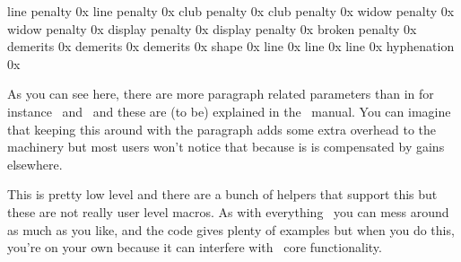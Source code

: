 \NC \type {\interlinepenalty}      \NC line penalty    \NC 0x\uchexnumbers\frozenlinepenaltycode    \NC \NR
\NC \type {\interlinepenalties}    \NC line penalty    \NC 0x\uchexnumbers\frozenlinepenaltycode    \NC \NR
\NC \type {\clubpenalty}           \NC club penalty    \NC 0x\uchexnumbers\frozenclubpenaltycode    \NC \NR
\NC \type {\clubpenalties}         \NC club penalty    \NC 0x\uchexnumbers\frozenclubpenaltycode    \NC \NR
\NC \type {\widowpenalty}          \NC widow penalty   \NC 0x\uchexnumbers\frozenwidowpenaltycode   \NC \NR
\NC \type {\widowpenalties}        \NC widow penalty   \NC 0x\uchexnumbers\frozenwidowpenaltycode   \NC \NR
\NC \type {\displaywidowpenalty}   \NC display penalty \NC 0x\uchexnumbers\frozendisplaypenaltycode \NC \NR
\NC \type {\displaywidowpenalties} \NC display penalty \NC 0x\uchexnumbers\frozendisplaypenaltycode \NC \NR
\NC \type {\brokenpenalty}         \NC broken penalty  \NC 0x\uchexnumbers\frozenbrokenpenaltycode  \NC \NR
\NC \type {\adjdemerits}           \NC demerits        \NC 0x\uchexnumbers\frozendemeritscode       \NC \NR
\NC \type {\doublehyphendemerits}  \NC demerits        \NC 0x\uchexnumbers\frozendemeritscode       \NC \NR
\NC \type {\finalhyphendemerits}   \NC demerits        \NC 0x\uchexnumbers\frozendemeritscode       \NC \NR
\NC \type {\parshape}              \NC shape           \NC 0x\uchexnumbers\frozenshapecode          \NC \NR
\NC \type {\baselineskip}          \NC line            \NC 0x\uchexnumbers\frozenlinecode           \NC \NR
\NC \type {\lineskip}              \NC line            \NC 0x\uchexnumbers\frozenlinecode           \NC \NR
\NC \type {\lineskiplimit}         \NC line            \NC 0x\uchexnumbers\frozenlinecode           \NC \NR
\NC \type {\hyphenationmode}       \NC hyphenation     \NC 0x\uchexnumbers\frozenhyphenationcode    \NC \NR
\stoptabulate


As you can see here, there are more paragraph related parameters than in for
instance \PDFTEX\ and \LUATEX\ and these are (to be) explained in the
\LUAMETATEX\ manual. You can imagine that keeping this around with the paragraph
adds some extra overhead to the machinery but most users won't notice that
because is is compensated by gains elsewhere.

This is pretty low level and there are a bunch of helpers that support this but
these are not really user level macros. As with everything \TEX\ you can mess
around as much as you like, and the code gives plenty of examples but when you do
this, you're on your own because it can interfere with \CONTEXT\ core
functionality.

